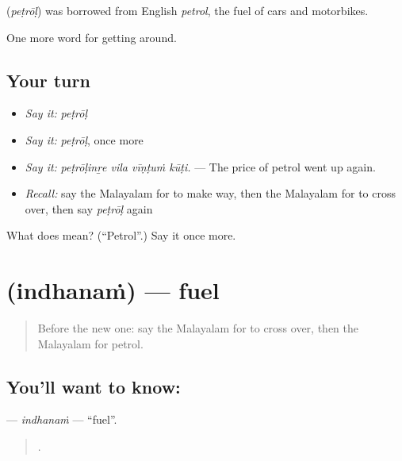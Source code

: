 \begin{cousinweb}
\textbf{} (\emph{peṭrōḷ}) was borrowed from English \emph{petrol}, the fuel of cars and motorbikes.
\end{cousinweb}

\begin{grammarlens}[title={What you've built}]
One more word for getting around.
\end{grammarlens}

\subsection*{Your turn}
\begin{itemize}
\raggedright
  \item \emph{Say it:} \emph{peṭrōḷ}
  \item \emph{Say it:} \emph{peṭrōḷ}, once more
  \item \emph{Say it:} \emph{peṭrōḷinṟe vila vīṇṭuṁ kūṭi.} — The price of petrol went up again.
  \item \emph{Recall:} say the Malayalam for to make way, then the Malayalam for to cross over, then say \emph{peṭrōḷ} again
\end{itemize}

\begin{tcolorbox}[breakable,colback=teal!4,colframe=teal!35!black,title={Before you move on}]
What does  mean? (\textquotedblleft{}Petrol\textquotedblright{}.) Say it once more.
\end{tcolorbox}
\section[\texorpdfstring{\ml{ഇന്ധനം} (indhanaṁ)}{ഇന്ധനം (indhanaṁ)}]{ (indhanaṁ) — fuel}

\label{lesson:ML-C470-indhanam}



\begin{quote}
Before the new one: say the Malayalam for to cross over, then the Malayalam for petrol.
\end{quote}

\subsection*{You'll want to know: }
\textbf{} — \emph{indhanaṁ} — \textquotedblleft{}fuel\textquotedblright{}.

\begin{quote}
   .
\end{quote}

